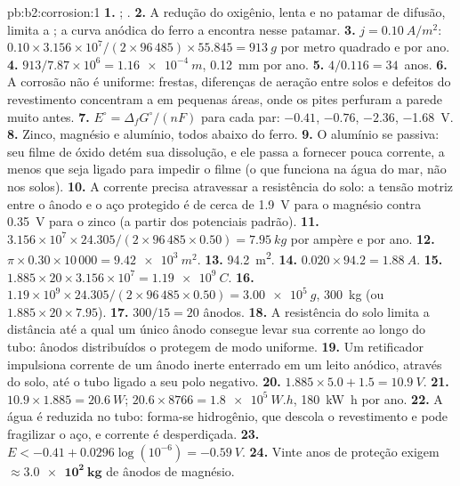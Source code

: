 \begin{solution}{pb:b2:corrosion:1}
\textbf{1.} ; .
\textbf{2.} A redução do oxigênio, lenta e no patamar de difusão, limita a
; a curva anódica do ferro a encontra nesse patamar.
\textbf{3.} $j = \qty{0.10}{A/m^2}$: $0.10 \times 3.156 \times 10^7/(2 \times 96\,485)
\times 55.845 = \qty{913}{g}$ por metro quadrado e por ano.
\textbf{4.} $913/7.87 \times 10^6 = \qty{1.16e-4}{m}$, \qty{0.12}{mm} por ano.
\textbf{5.} $4/0.116 = 34$~anos.
\textbf{6.} A corrosão não é uniforme: frestas, diferenças de aeração entre
solos e defeitos do revestimento concentram a  em pequenas
áreas, onde os pites perfuram a parede muito antes.
\textbf{7.} $E^\circ = \Delta_f G^\circ/(nF)$ para cada par:  $-0.41$,  $-0.76$,
 $-2.36$,  \qty{-1.68}{V}.
\textbf{8.} Zinco, magnésio e alumínio, todos abaixo do ferro.
\textbf{9.} O alumínio se passiva: seu filme de óxido detém sua dissolução, e
ele passa a fornecer pouca corrente, a menos que seja ligado para impedir o
filme (o que funciona na água do mar, não nos solos).
\textbf{10.} A corrente precisa atravessar a resistência do solo: a tensão
motriz entre o ânodo e o aço protegido é de cerca de \qty{1.9}{V} para o
magnésio contra \qty{0.35}{V} para o zinco (a partir dos potenciais padrão).
\textbf{11.} $3.156 \times 10^7 \times 24.305/(2 \times 96\,485 \times 0.50) =
\qty{7.95}{kg}$ por ampère e por ano.
\textbf{12.} $\pi \times 0.30 \times 10\,000 = \qty{9.42e3}{m^2}$.
\textbf{13.} \qty{94.2}{m^2}.
\textbf{14.} $0.020 \times 94.2 = \qty{1.88}{A}$.
\textbf{15.} $1.885 \times 20 \times 3.156 \times 10^7 = \qty{1.19e9}{C}$.
\textbf{16.} $1.19 \times 10^9 \times 24.305/(2 \times 96\,485 \times 0.50) =
\qty{3.00e5}{g}$, \qty{300}{kg} (ou $1.885 \times 20 \times 7.95$).
\textbf{17.} $300/15 = 20$ ânodos.
\textbf{18.} A resistência do solo limita a distância até a qual um único ânodo
consegue levar sua corrente ao longo do tubo: ânodos distribuídos o protegem
de modo uniforme.
\textbf{19.} Um retificador impulsiona corrente de um ânodo inerte enterrado em
um leito anódico, através do solo, até o tubo ligado a seu polo negativo.
\textbf{20.} $1.885 \times 5.0 + 1.5 = \qty{10.9}{V}$.
\textbf{21.} $10.9 \times 1.885 = \qty{20.6}{W}$; $20.6 \times 8766 = \qty{1.8e5}{W.h}$,
\qty{180}{kW.h} por ano.
\textbf{22.} A água é reduzida no tubo: forma-se hidrogênio, que descola o
revestimento e pode fragilizar o aço, e corrente é desperdiçada.
\textbf{23.} $E < -0.41 + 0.0296\log(10^{-6}) = \qty{-0.59}{V}$.
\textbf{24.} Vinte anos de proteção exigem $\boldsymbol{\approx \qty{3.0e2}{kg}}$
de ânodos de magnésio.
\end{solution}
